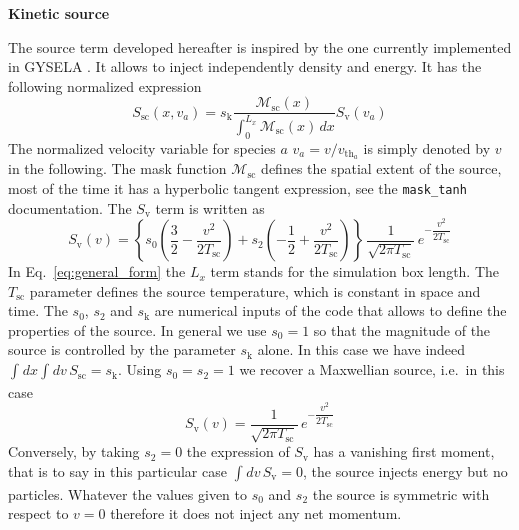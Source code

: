 \documentclass[11pt]{article}
\begin{document}
\begin{center}
    \LARGE \textbf{Kinetic source} \\
    \vspace{0.8cm} 
\end{center}

The source term developed hereafter is inspired by the one currently implemented in GYSELA \cite[Appendix A]{Sarazin_2011}. It allows to inject independently density and energy. It has the following normalized expression
%
\begin{equation}\label{eq:general_form}
   S_\mathrm{sc}(x, v_a) = s_\mathrm{k} \dfrac{\mathcal{M}_\mathrm{sc}(x)}{\int_{0}^{L_x} \mathcal{M}_\mathrm{sc}(x) \, dx} S_\mathrm{v}(v_a) 
\end{equation}
%
The normalized velocity variable for species $a$ $v_a = v/v_{\mathrm{th}_a}$ is simply denoted by $v$ in the following. The mask function $\mathcal{M}_\mathrm{sc}$ defines the spatial extent of the source, most of the time it has a hyperbolic tangent expression, see the \texttt{mask\_tanh} documentation. The  $S_\mathrm{v}$ term is written as
%
\begin{equation}\label{eq:sv_expression}
  S_\mathrm{v}(v) = \left\{ s_0\left( \dfrac{3}{2} - \dfrac{v^2}{2 T_\mathrm{sc}} \right) + s_2 \left( -\dfrac{1}{2} + \dfrac{v^2}{2 T_\mathrm{sc}} \right)  \right\} \, \dfrac{1}{\sqrt{2 \pi  T_\mathrm{sc}} } \, e^{- \dfrac{v^2}{2 T_\mathrm{sc}}}
\end{equation}
%
In Eq.~\ref{eq:general_form} the $L_x$ term stands for the simulation box length. The $T_\mathrm{sc}$ parameter defines the source temperature, which is constant in space and time. The  $s_0$, $s_2$ and $s_\mathrm{k}$ are numerical inputs of the code that allows to define the properties of the source. In general we use $s_0 = 1$ so that the magnitude of the source is controlled by the parameter $s_\mathrm{k}$ alone. In this case we have indeed $\int_{}^{} d x \int_{}^{} dv \, S_\mathrm{sc} = s_\mathrm{k}$. Using $s_0 = s_2 = 1$ we recover a Maxwellian source, i.e.\ in this case 
%
\begin{equation}
  S_\mathrm{v}(v) = \dfrac{1}{\sqrt{2\pi T_\mathrm{sc}}} \, e^{- \dfrac{v^2}{2 T_\mathrm{sc}}}
\end{equation}
%
Conversely, by taking $s_2 = 0$ the expression of $S_\mathrm{v}$ has a vanishing first moment, that is to say in this particular case $\int_{}^{} dv\, S_\mathrm{v} = 0$, the source injects energy but no particles. Whatever the values given to $s_0$ and $s_2$ the source is symmetric with respect to $v=0$ therefore it does not inject any net momentum.
\end{document}
